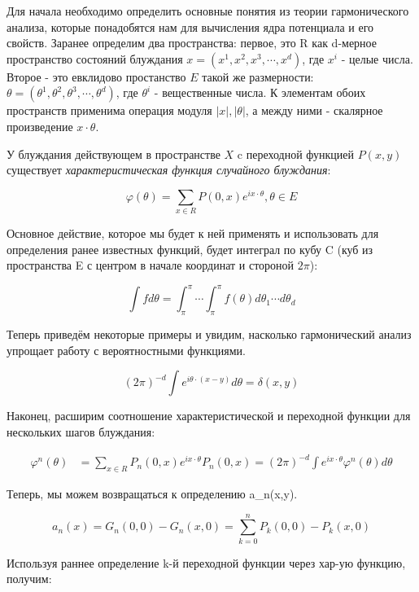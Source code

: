 Для начала необходимо определить основные понятия из теории гармонического анализа, которые понадобятся нам для вычисления ядра потенциала и его свойств.
Заранее определим два пространства: первое, это R как d-мерное пространство состояний блуждания $x = (x^1, x^2, x^3, \cdots, x^d)$, где $x^i$ - целые числа. 
Второе - это евклидово простанство $E$ такой же размерности: $\theta = (\theta^1, \theta^2, \theta^3, \cdots, \theta^d)$, где $\theta^i$ - вещественные числа.
К элементам обоих пространств применима операция модуля $|x|, |\theta|$, а между ними - скалярное произведение $x \cdot \theta$.

У блуждания действующем в пространстве $X$ c переходной функцией $P(x,y)$ существует \textit{характеристическая функция случайного блуждания}:

\[ \varphi(\theta) = \sum_{x \in R} P(0,x) e^{i x \cdot \theta}, \theta \in E \]

Основное действие, которое мы будет к ней применять и использовать для определения ранее известных функций, будет интеграл по кубу C (куб из пространства E 
с центром в начале координат и стороной $2\pi$):

\[ \int f d\theta = \int^\pi_\pi \cdots \int^\pi_\pi f(\theta) d\theta_1 \cdots d\theta_d \]

Теперь приведём некоторые примеры и увидим, насколько гармонический анализ упрощает работу с вероятностными функциями.

\[ (2\pi)^{-d} \int e^{i\theta \cdot (x-y)} d\theta = \delta(x,y) \]

Наконец, расширим соотношение характеристической и переходной функции для нескольких шагов блуждания:

\begin{align*}
\varphi^n(\theta) &= \sum_{x \in R} P_n(0,x) e^{i x \cdot \theta}
P_n(0,x) = (2\pi)^{-d} \int e^{i x\cdot \theta } \varphi^n(\theta) d\theta
\end{align*}

Теперь, мы можем возвращаться к определению a_n(x,y).

\[ a_n(x) = G_n(0,0) - G_n(x,0) = \sum_{k=0}^{n} P_k(0,0) - P_k(x,0) \]

Используя раннее определение k-й переходной функции через хар-ую функцию, получим:

